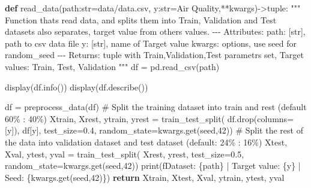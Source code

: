 \documentclass[
  letterpaper,
  DIV=11,
  numbers=noendperiod]{scrartcl}
\newenvironment{Shaded}{\begin{snugshade}}{\end{snugshade}}
\newcommand{\BuiltInTok}[1]{\textcolor[rgb]{0.00,0.23,0.31}{#1}}
\newcommand{\CommentTok}[1]{\textcolor[rgb]{0.37,0.37,0.37}{#1}}
\newcommand{\ControlFlowTok}[1]{\textcolor[rgb]{0.00,0.23,0.31}{\textbf{#1}}}
\newcommand{\DecValTok}[1]{\textcolor[rgb]{0.68,0.00,0.00}{#1}}
\newcommand{\FloatTok}[1]{\textcolor[rgb]{0.68,0.00,0.00}{#1}}
\newcommand{\KeywordTok}[1]{\textcolor[rgb]{0.00,0.23,0.31}{\textbf{#1}}}
\newcommand{\NormalTok}[1]{\textcolor[rgb]{0.00,0.23,0.31}{#1}}
\newcommand{\OperatorTok}[1]{\textcolor[rgb]{0.37,0.37,0.37}{#1}}
\newcommand{\SpecialCharTok}[1]{\textcolor[rgb]{0.37,0.37,0.37}{#1}}
\newcommand{\SpecialStringTok}[1]{\textcolor[rgb]{0.13,0.47,0.30}{#1}}
\newcommand{\StringTok}[1]{\textcolor[rgb]{0.13,0.47,0.30}{#1}}
\begin{document}
\begin{Shaded}
\begin{Highlighting}[]
\KeywordTok{def}\NormalTok{ read\_data(path:}\BuiltInTok{str}\OperatorTok{=}\StringTok{\textquotesingle{}data/data.csv\textquotesingle{}}\NormalTok{, y:}\BuiltInTok{str}\OperatorTok{=}\StringTok{\textquotesingle{}Air Quality\textquotesingle{}}\NormalTok{,}\OperatorTok{**}\NormalTok{kwargs)}\OperatorTok{{-}\textgreater{}}\BuiltInTok{tuple}\NormalTok{:}
    \CommentTok{""" Function thats read data, and splits them into Train, Validation and Test datasets}
\CommentTok{    also separates, target value from others values.}
\CommentTok{    {-}{-}{-}}
\CommentTok{    Attributes:}
\CommentTok{    path: [str], path to csv data file}
\CommentTok{    y: [str], name of Target value}
\CommentTok{    kwargs: options, use seed for random\_seed}
\CommentTok{    {-}{-}{-}}
\CommentTok{    Returns:}
\CommentTok{    tuple with Train,Validation,Test parametrs set, Target values: Train, Test, Validation}
\CommentTok{    """}
\NormalTok{    df }\OperatorTok{=}\NormalTok{ pd.read\_csv(path)}

\NormalTok{    display(df.info())}
\NormalTok{    display(df.describe())}
    
\NormalTok{    df }\OperatorTok{=}\NormalTok{ preprocess\_data(df)}
    \CommentTok{\# Split the training dataset into train and rest (default 60\% : 40\%)}
\NormalTok{    Xtrain, Xrest, ytrain, yrest }\OperatorTok{=}\NormalTok{ train\_test\_split(}
\NormalTok{        df.drop(columns}\OperatorTok{=}\NormalTok{[y]), df[y], test\_size}\OperatorTok{=}\FloatTok{0.4}\NormalTok{, random\_state}\OperatorTok{=}\NormalTok{kwargs.get(}\StringTok{\textquotesingle{}seed\textquotesingle{}}\NormalTok{,}\DecValTok{42}\NormalTok{))}
    \CommentTok{\# Split the rest of the data into validation dataset and test dataset (default: 24\% : 16\%)}
\NormalTok{    Xtest, Xval, ytest, yval }\OperatorTok{=}\NormalTok{ train\_test\_split(}
\NormalTok{        Xrest, yrest, test\_size}\OperatorTok{=}\FloatTok{0.5}\NormalTok{, random\_state}\OperatorTok{=}\NormalTok{kwargs.get(}\StringTok{\textquotesingle{}seed\textquotesingle{}}\NormalTok{,}\DecValTok{42}\NormalTok{))}
    \BuiltInTok{print}\NormalTok{(}\SpecialStringTok{f\textquotesingle{}Dataset: }\SpecialCharTok{\{}\NormalTok{path}\SpecialCharTok{\}}\SpecialStringTok{ | Target value: }\SpecialCharTok{\{}\NormalTok{y}\SpecialCharTok{\}}\SpecialStringTok{ | Seed: }\SpecialCharTok{\{}\NormalTok{kwargs}\SpecialCharTok{.}\NormalTok{get(}\StringTok{\textquotesingle{}seed\textquotesingle{}}\NormalTok{,}\DecValTok{42}\NormalTok{)}\SpecialCharTok{\}}\SpecialStringTok{\textquotesingle{}}\NormalTok{)}
    \ControlFlowTok{return}\NormalTok{ Xtrain, Xtest, Xval, ytrain, ytest, yval}
\end{Highlighting}
\end{Shaded}
\end{document}
